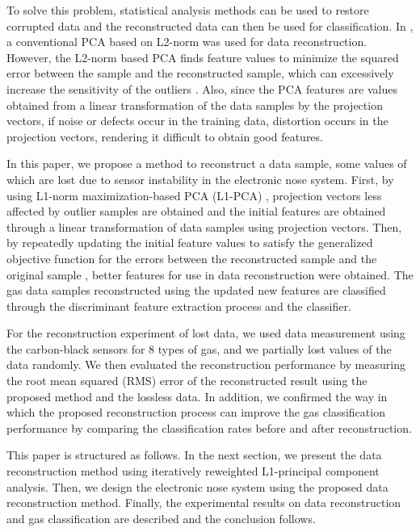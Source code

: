 \documentclass[10pt,letterpaper]{article}
\begin{document}
To solve this problem, statistical analysis methods can be used to restore corrupted data and the reconstructed data can then be used for classification. 
In \cite{wang2007reconstruction}, a conventional PCA based on L2-norm was used for data reconstruction. 
However, the L2-norm based PCA finds feature values to minimize the squared error between the sample and the reconstructed sample, which can excessively increase the sensitivity of the outliers \cite{kwak2008principal}. 
Also, since the PCA features are values obtained from a linear transformation of the data samples by the projection vectors, 
if noise or defects occur in the training data, distortion occurs in the projection vectors, rendering it difficult to obtain good features.

In this paper, we propose a method to reconstruct a data sample, some values of which are lost due to sensor instability in the electronic nose system. 
First, by using L1-norm maximization-based PCA (L1-PCA) \cite{kwak2008principal}, projection vectors less affected by outlier samples are obtained and the initial features are obtained through a linear transformation of data samples using projection vectors. 
Then, by repeatedly updating the initial feature values to satisfy the generalized objective function for the errors between the reconstructed sample and the original sample \cite{zuo2006robust}, better features for use in data reconstruction were obtained. 
The gas data samples reconstructed using the updated new features are classified through the discriminant feature extraction process and the classifier.

For the reconstruction experiment of lost data, we used data measurement using the carbon-black sensors for 8 types of gas, and we partially lost values of the data randomly\cite{yang2005matched}. 
We then evaluated the reconstruction performance by measuring the root mean squared (RMS) error of the reconstructed result using the proposed method and the lossless data. 
In addition, we confirmed the way in which the proposed reconstruction process can improve the gas classification performance by comparing the classification rates before and after reconstruction.

This paper is structured as follows. 
In the next section, we present the data reconstruction method using iteratively reweighted L1-principal component analysis. 
Then, we design the electronic nose system using the proposed data reconstruction method. 
Finally, the experimental results on data reconstruction and gas classification are described and the conclusion follows.
\end{document}

